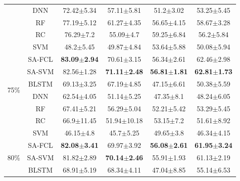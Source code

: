 \begin{table}
\begin{tabular}{c c cccc}
    & DNN & \multicolumn{1}{c}{72.42$\pm$5.34} & \multicolumn{1}{c}{57.11$\pm$5.81} & \multicolumn{1}{c}{51.2$\pm$3.02} & 53.25$\pm$5.45\\
    & RF & \multicolumn{1}{c}{77.19$\pm$5.12} & \multicolumn{1}{c}{61.27$\pm$4.35} & \multicolumn{1}{c}{56.65$\pm$4.15} & 58.67$\pm$3.28\\
    & RC & \multicolumn{1}{c}{76.29$\pm$7.2} & \multicolumn{1}{c}{55.09$\pm$4.7} & \multicolumn{1}{c}{59.25$\pm$6.84} & 56.2$\pm$5.84\\
    & SVM & \multicolumn{1}{c}{48.2$\pm$5.45} & \multicolumn{1}{c}{49.87$\pm$4.84} & \multicolumn{1}{c}{53.64$\pm$5.88} & 50.08$\pm$5.94\\
    \midrule
    \multirow{6}{*}{75\%}
    & SA-FCL & \multicolumn{1}{c}{{\bfseries 83.09$\pm$2.94}} & \multicolumn{1}{c}{70.61$\pm$3.15} & \multicolumn{1}{c}{56.34$\pm$2.61} & {62.46$\pm$2.98}\\
    & SA-SVM & \multicolumn{1}{c}{82.56$\pm$1.28} & \multicolumn{1}{c}{{\bfseries 71.11$\pm$2.48}} & \multicolumn{1}{c}{{\bfseries 56.81$\pm$1.81}} & {\bfseries 62.81$\pm$1.73}\\
    & BLSTM & \multicolumn{1}{c}{69.13$\pm$3.25} & \multicolumn{1}{c}{67.19$\pm$4.85} & \multicolumn{1}{c}{47.15$\pm$6.61} & 50.38$\pm$5.59\\
    & DNN & \multicolumn{1}{c}{62.54$\pm$4.05} & \multicolumn{1}{c}{51.14$\pm$5.25} & \multicolumn{1}{c}{47.35$\pm$8.1} & 48.24$\pm$6.05\\
    & RF & \multicolumn{1}{c}{67.41$\pm$5.21} & \multicolumn{1}{c}{56.29$\pm$5.04} & \multicolumn{1}{c}{52.21$\pm$5.42} & 53.29$\pm$5.45\\
    & RC & \multicolumn{1}{c}{66.9$\pm$11.45} & \multicolumn{1}{c}{51.94$\pm$10.18} & \multicolumn{1}{c}{53.15$\pm$7.2} & 51.61$\pm$8.92\\
    & SVM & \multicolumn{1}{c}{46.15$\pm$4.8} & \multicolumn{1}{c}{45.7$\pm$5.25} & \multicolumn{1}{c}{49.65$\pm$3.8} & 46.34$\pm$4.15\\
    \midrule
    \multirow{6}{*}{80\%}
    & SA-FCL & \multicolumn{1}{c}{{\bfseries 82.08$\pm$3.41}} & \multicolumn{1}{c}{69.97$\pm$3.92} & \multicolumn{1}{c}{{\bfseries 56.08$\pm$2.61}} & {\bfseries 61.95$\pm$3.24}\\
    & SA-SVM & \multicolumn{1}{c}{81.82$\pm$2.89} & \multicolumn{1}{c}{{\bfseries 70.14$\pm$2.46}} & \multicolumn{1}{c}{55.91$\pm$1.93} & {61.13$\pm$2.19}\\
    & BLSTM & \multicolumn{1}{c}{68.91$\pm$5.19} & \multicolumn{1}{c}{68.34$\pm$4.11} & \multicolumn{1}{c}{47.04$\pm$8.85} & 55.14$\pm$6.53\\

\end{tabular}
\end{table}
